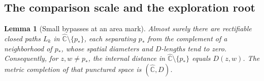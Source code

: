 \documentclass[11pt]{article}
\numberwithin{equation}{section}
\newtheorem{lemma}[theorem]{Lemma}
\theoremstyle{definition}
\theoremstyle{remark}
\newcommand{\1}{\mathbf 1}
\begin{document}
\subsection{The comparison scale and the exploration root}

\begin{lemma}[Small bypasses at an area mark]
\label{comp:root-bypass}
Almost surely there are rectifiable closed paths $L_k$ in
$\widehat{\mathbb C}\setminus\{p_*\}$, each separating $p_*$ from the complement of
a neighborhood of $p_*$, whose spatial diameters and $D$-lengths tend
to zero.  Consequently, for $z,w\ne p_*$, the internal distance in
$\widehat{\mathbb C}\setminus\{p_*\}$ equals $D(z,w)$.  The metric completion of
that punctured space is $(\widehat{\mathbb C},D)$.
\end{lemma}
\end{document}
